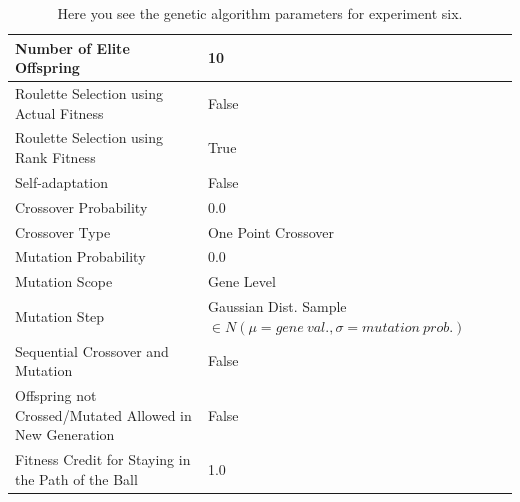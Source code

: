 \documentclass[a4paper,10pt]{article}
\begin{document}
\begin{table}[H]
\footnotesize
\begin{tabular}{ >{\columncolor[gray]{0.8}} l | l }
\hline
Number of Elite Offspring                                            & 10                                                                             \\ \hline
Roulette Selection using Actual Fitness                              & False                                                                          \\ \hline
Roulette Selection using Rank Fitness                                & True                                                                           \\ \hline
Self-adaptation                                                      & False                                                                          \\ \hline
Crossover Probability                                                & 0.0                                                                            \\ \hline
Crossover Type                                                       & One Point Crossover                                                            \\ \hline
Mutation Probability                                                 & 0.0                                                                            \\ \hline
Mutation Scope                                                       & Gene Level                                                                     \\ \hline
Mutation Step                                                        & Gaussian Dist. Sample $\in N(\mu=gene \ val., \sigma = mutation \ prob.)$      \\ \hline
Sequential Crossover and Mutation                                    & False                                                      	              \\ \hline
Offspring not Crossed/Mutated Allowed in New Generation              & False                                                     	              \\ \hline
Fitness Credit for Staying in the Path of the Ball                   & 1.0                                                      	              \\ \hline
\end{tabular}
\caption{Here you see the genetic algorithm parameters for experiment six.}
\label{tab:exp6}
\end{table}
\end{document}
